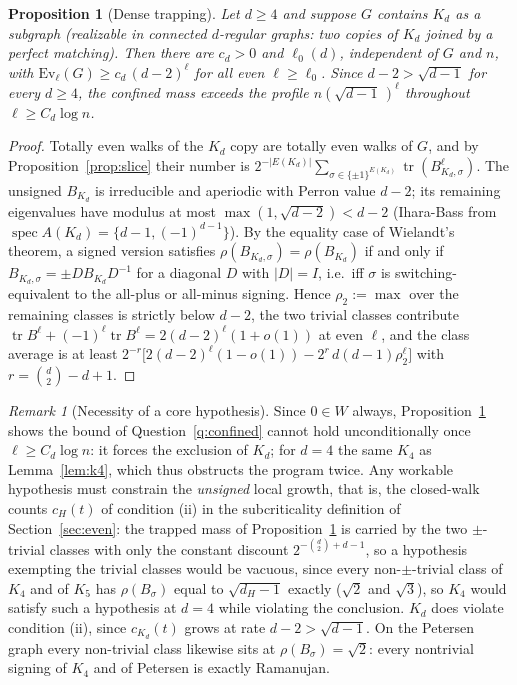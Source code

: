 \documentclass[11pt]{article}
\newtheorem{proposition}[lemma]{Proposition}
\theoremstyle{remark}
\newtheorem{remark}[lemma]{Remark}
\DeclareMathOperator{\tr}{tr}
\begin{document}
\begin{proposition}[Dense trapping]\label{prop:trap}
Let $d\ge4$ and suppose $G$ contains $K_d$ as a subgraph (realizable in
connected $d$-regular graphs: two copies of $K_d$ joined by a perfect
matching). Then there are $c_d>0$ and $\ell_0(d)$, independent of $G$
and $n$, with $\mathrm{Ev}_\ell(G)\ge c_d\,(d-2)^{\ell}$ for all even
$\ell\ge\ell_0$. Since $d-2>\sqrt{d-1}$ for every $d\ge4$, the confined
mass exceeds the profile $n(\sqrt{d-1}\,)^{\ell}$ throughout
$\ell\ge C_d\log n$.
\end{proposition}

\begin{proof}
Totally even walks of the $K_d$ copy are totally even walks of $G$, and
by Proposition~\ref{prop:slice} their number is
$2^{-|E(K_d)|}\sum_{\sigma\in\{\pm1\}^{E(K_d)}}\tr(B_{K_d,\sigma}^\ell)$.
The unsigned $B_{K_d}$ is irreducible and aperiodic with Perron value
$d-2$; its remaining eigenvalues have modulus at most
$\max(1,\sqrt{d-2})<d-2$ (Ihara-Bass from
$\operatorname{spec}A(K_d)=\{d-1,(-1)^{d-1}\}$). By the equality case of
Wielandt's theorem, a signed version satisfies
$\rho(B_{K_d,\sigma})=\rho(B_{K_d})$ if and only if
$B_{K_d,\sigma}=\pm D B_{K_d}D^{-1}$ for a diagonal $D$ with
$|D|=I$, i.e.\ iff $\sigma$ is switching-equivalent to the all-plus or
all-minus signing. Hence $\rho_2:=\max$ over the remaining classes is
strictly below $d-2$, the two trivial classes contribute
$\tr B^\ell+(-1)^\ell\tr B^\ell=2(d-2)^\ell(1+o(1))$ at even $\ell$, and
the class average is at least
$2^{-r}\big[2(d-2)^\ell(1-o(1))-2^{r}\,d(d-1)\rho_2^{\ell}\big]$ with
$r=\binom d2-d+1$.
\end{proof}

\begin{remark}[Necessity of a core hypothesis]\label{rem:core}
Since $0\in W$ always, Proposition~\ref{prop:trap} shows the bound of
Question~\ref{q:confined} cannot hold unconditionally once
$\ell\ge C_d\log n$: it forces the exclusion of $K_d$; for $d=4$
the same $K_4$ as Lemma~\ref{lem:k4}, which thus obstructs the program
twice. Any workable hypothesis must constrain the \emph{unsigned}
local growth, that is, the closed-walk counts $c_H(t)$ of condition
(ii) in the subcriticality definition of Section~\ref{sec:even}: the
trapped mass of Proposition~\ref{prop:trap} is carried by the two
$\pm$-trivial classes with only the constant discount
$2^{-\binom d2+d-1}$, so a hypothesis exempting the trivial classes
would be vacuous, since every non-$\pm$-trivial class of $K_4$ and of
$K_5$ has $\rho(B_\sigma)$ equal to $\sqrt{d_H-1}$ exactly ($\sqrt2$
and $\sqrt3$), so $K_4$ would satisfy such a hypothesis at $d=4$ while
violating the conclusion. $K_d$ does violate condition (ii), since
$c_{K_d}(t)$ grows at rate $d-2>\sqrt{d-1}$. On the Petersen graph
every non-trivial class likewise sits at $\rho(B_\sigma)=\sqrt2$:
every nontrivial signing of $K_4$ and of Petersen is exactly
Ramanujan.
\end{remark}
\end{document}
